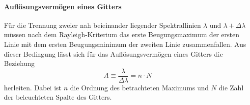 \documentclass[12pt,a4paper]{article}
\begin{document}
	\paragraph{Auflösungsvermögen eines Gitters}
	Für die Trennung zweier nah beieinander liegender Spektrallinien $\lambda$ und $\lambda + \Delta \lambda$ müssen nach dem Rayleigh-Kriterium das erste Beugungsmaximum der ersten Linie mit dem ersten Beugungsminimum der zweiten Linie zusammenfallen. Aus dieser Bedingung lässt sich für das Auflösungsvermögen eines Gitters die Beziehung
	\begin{equation}
	A \equiv \dfrac{\lambda}{\Delta \lambda} = n \cdot N
	\label{eq:AuflösungsvermögenGitterspektrometer}
	\end{equation}
	herleiten. Dabei ist $n$ die Ordnung des betrachteten Maximums und $N$ die Zahl der beleuchteten Spalte des Gitters.
	
\end{document}
